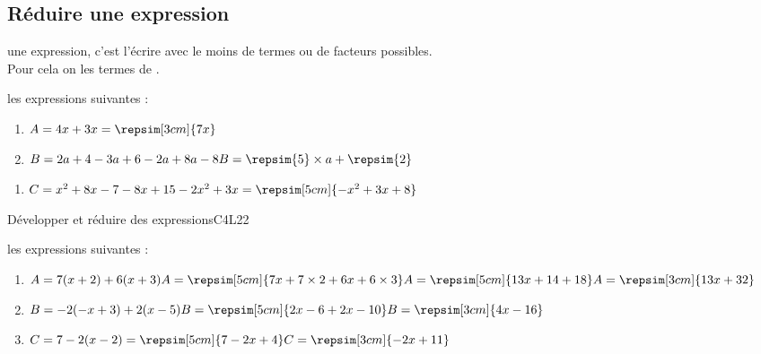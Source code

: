 \subsection{Réduire une expression}
\begin{Definition}
     une expression, c’est l’écrire avec le moins de termes ou de facteurs possibles. \\
    Pour cela on  les termes de . 
\end{Definition}
\begin{Exemple}
    \vspace{-0.25cm}
    \begin{multicols}{2}
         les expressions suivantes :
        \begin{enumerate}
            \item $A = 4x+3x = \repsim[3cm]{7x}$
            \item $B = 2a+4-3a+6-2a+8a-8\\B = \repsim{5}\times a + \repsim{2}$
        \end{enumerate}
    \end{multicols}
    \vspace{-0.25cm}
    \begin{enumerate}[start=3]
        \item $C= x^{2}+8x-7-8x+15-2x^{2}+3x = \repsim[5cm]{-x^2 + 3x + 8}$
    \end{enumerate}
\end{Exemple}
\newpage
\def\points{6}
\def\rdifficulty{2.5}
\begin{EXO}{Développer et réduire des expressions}{C4L22}
    \vspace{-0.25cm}
    \begin{multicols}{2}
         les expressions suivantes :
        \begin{enumerate}
            \item $A=7(x+2)+6(x+3)\\
             A = \repsim[5cm]{7x + 7\times 2 + 6x + 6 \times 3}\\
             A = \repsim[5cm]{13x + 14 + 18}\\
             A = \repsim[3cm]{13x + 32}$

            \columnbreak


            \item $B=-2(-x+3) + 2(x-5)\\
             B = \repsim[5cm]{2x -6 + 2x - 10}\\
             B = \repsim[3cm]{4x-16}$
            \item $C= 7-2(x-2) = \repsim[5cm]{7 - 2x + 4}\\
             C = \repsim[3cm]{-2x + 11}$
        \end{enumerate}
    \end{multicols}
\end{EXO}  

